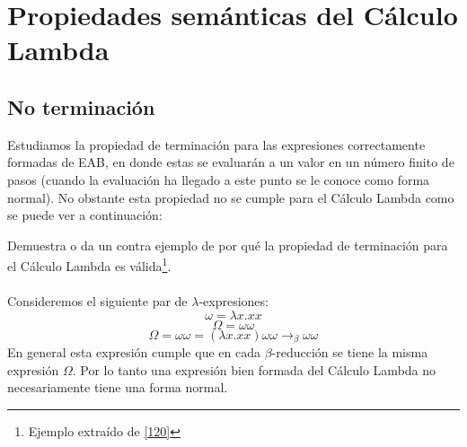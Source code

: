         \section{Propiedades semánticas del Cálculo Lambda}

                \subsection{No terminación}
                    Estudiamos la propiedad de terminación para las expresiones correctamente formadas de \textsf{EAB}, en donde estas se evaluarán a un valor en un número finito de pasos (cuando la evaluación ha llegado a este punto se le conoce como forma normal). 
                    No obstante esta propiedad no se cumple para el Cálculo Lambda como se puede ver a continuación:
                    \begin{exercise}
                        Demuestra o da un contra ejemplo de por qué la propiedad de terminación para el Cálculo Lambda es válida\footnote{Ejemplo extraído de \hyperlink{120}{[120]}}.\\\\
                        Consideremos el siguiente par de $\lambda$-expresiones:\\
                        $$ \omega = \lambda x.xx$$
                        $$ \Omega = \omega \omega$$
                        $$ \Omega = \omega \omega = (\lambda x.xx) \omega \omega \rightarrow_\beta \omega \omega$$
                        En general esta expresión cumple que en cada $\beta$-reducción se tiene la misma expresión $\Omega$.
                        Por lo tanto una expresión bien formada del Cálculo Lambda no necesariamente tiene una forma normal.
                    \end{exercise}

